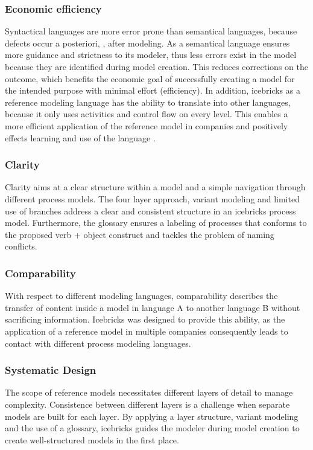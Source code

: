	  \subsubsection{Economic efficiency}
	 Syntactical languages are more error prone than semantical languages, because defects occur a posteriori, \ie, after modeling. As a semantical language ensures more guidance and strictness to its modeler, thus less errors exist in the model because they are identified during model creation. This reduces corrections on the outcome, which benefits the economic goal of successfully creating a model for the intended purpose with minimal effort (efficiency). In addition, icebricks as a reference modeling language has the ability to translate into other languages, because it only uses activities and control flow on every level. This enables a more efficient application of the reference model in companies and positively effects learning and use of the language \citep{Muehlen}. 
	 
	 \subsubsection{Clarity}
	 Clarity aims at a clear structure within a model and a simple navigation through different process models. The four layer approach, variant modeling and limited use of branches address a clear and consistent structure in an icebricks process model. Furthermore, the glossary ensures a labeling of processes that conforms to the proposed verb + object construct \citep{7pmg} and tackles the problem of naming conflicts.
	 
	 \subsubsection{Comparability} 
	 With respect to different modeling languages, comparability describes the transfer of content inside a model in language A to another language B without sacrificing information. Icebricks was designed to provide this ability, as the application of a reference model in multiple companies consequently leads to contact with different process modeling languages. 
	 
	 \subsubsection{Systematic Design}
	 The scope of reference models necessitates different layers of detail to manage complexity. Consistence between different layers is a challenge when separate models are built for each layer. By applying a layer structure, variant modeling and the use of a glossary, icebricks guides the modeler during model creation to create well-structured models in the first place. 

	
